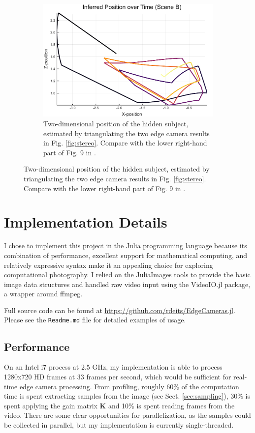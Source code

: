 \documentclass{article}
\begin{document}
\begin{figure}[htbp]
	\begin{subfigure}[t]{0.45\textwidth}
		\includegraphics[width=\textwidth]{img/stereo_path.pdf}
		\caption{Two-dimensional position of the hidden subject, estimated by triangulating the two edge camera results in Fig. \ref{fig:stereo}. Compare with the lower right-hand part of Fig. 9 in \cite{bouman_turningcornerscameras2017}.}
		\label{fig:2d-path}
	\end{subfigure}
\end{figure}

\section{Implementation Details}

I chose to implement this project in the Julia programming language \cite{bezanson_juliafreshapproach2017} because its combination of performance, excellent support for mathematical computing, and relatively expressive syntax make it an appealing choice for exploring computational photography. I relied on the JuliaImages \cite{_juliaimages} tools to provide the basic image data structures and handled raw video input using the VideoIO.jl package, a wrapper around ffmpeg. 

Full source code can be found at \href{https://github.com/rdeits/EdgeCameras.jl}{https://github.com/rdeits/EdgeCameras.jl}. Please see the \texttt{Readme.md} file for detailed examples of usage. 

\subsection{Performance}

On an Intel i7 process at 2.5 GHz, my implementation is able to process 1280x720 HD frames at 33 frames per second, which would be sufficient for real-time edge camera processing. From profiling, roughly 60\% of the computation time is spent extracting samples from the image (see Sect. \ref{sec:sampling}), 30\% is spent applying the gain matrix $\textbf{K}$ and 10\% is spent reading frames from the video. There are some clear opportunities for parallelization, as the samples could be collected in parallel, but my implementation is currently single-threaded. 
\end{document}
